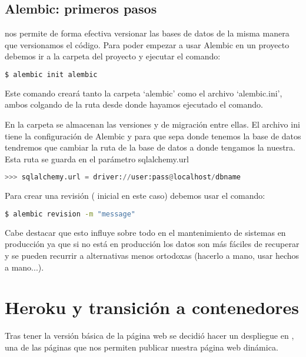 \subsection{Alembic: primeros pasos}

 nos permite de forma efectiva versionar las bases de datos de la misma manera que versionamos el código. Para poder empezar a usar Alembic en un proyecto debemos ir a la carpeta del proyecto y ejecutar el comando:

\begin{lstlisting}[language=bash]
  $ alembic init alembic
\end{lstlisting}

Este comando creará tanto la carpeta `alembic' como el archivo `alembic.ini', ambos colgando de la ruta desde donde hayamos ejecutado el comando. 

En la carpeta se almacenan las versiones y  de migración entre ellas. El archivo ini tiene la configuración de Alembic y para que sepa donde tenemos la base de datos tendremos que cambiar la ruta de la base de datos a donde tengamos la nuestra. Esta ruta se guarda en el parámetro sqlalchemy.url

\begin{lstlisting}[language=python]
  >>> sqlalchemy.url = driver://user:pass@localhost/dbname
\end{lstlisting}



Para crear una revisión ( inicial en este caso) debemos usar el comando:

\begin{lstlisting}[language=bash]
  $ alembic revision -m "message"
\end{lstlisting}

Cabe destacar que esto influye sobre todo en el mantenimiento de sistemas en producción ya que si no está en producción los datos son más fáciles de recuperar y se pueden recurrir a alternativas menos ortodoxas (hacerlo a mano, usar  hechos a mano...).



\section{Heroku y transición a contenedores}

Tras tener la versión básica de la página web se decidió hacer un despliegue en , una de las páginas que nos permiten publicar nuestra página web dinámica. 

